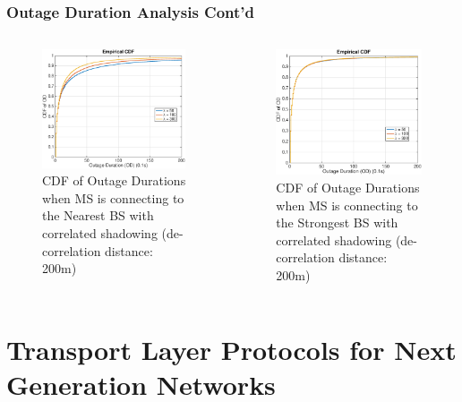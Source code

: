 \documentclass{beamer}
\begin{document}
 \begin{frame}
 \frametitle{Outage Duration Analysis Cont'd}
 \begin{columns}[c]
 \begin{figure}
 \centering
 \includegraphics[width=5cm]{ODthresh-5DeCorr200NBMode2.eps}
 \caption{CDF of Outage Durations when MS is connecting to the Nearest BS with correlated shadowing (de-correlation distance: 200m)}
 \label{corr1}
 \end{figure}
 \begin{figure}
 \centering
 \includegraphics[width=5cm]{ODthresh-5DeCorr200MaxMode2.eps}
 \caption{CDF of Outage Durations when MS is connecting to the Strongest BS with correlated shadowing (de-correlation distance: 200m)}
 \label{corr2}
 \end{figure}
 \end{columns}
\end{frame}
\section{Transport Layer Protocols for Next Generation Networks}
\end{document}

